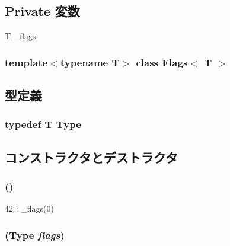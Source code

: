 \subsection*{Private 変数}
\begin{DoxyCompactItemize}
\item 
T \hyperlink{classFlags_a1d4945ed95e4ef8f9668e313afb5bd12}{\_\-flags}
\end{DoxyCompactItemize}
\subsubsection*{template$<$typename T$>$ class Flags$<$ T $>$}



\subsection{型定義}
\hypertarget{classFlags_a685b7a70f0ae1f2881cf8937d951c3b1}{
\subsubsection[{Type}]{\setlength{\rightskip}{0pt plus 5cm}typedef T {\bf Type}}}
\label{classFlags_a685b7a70f0ae1f2881cf8937d951c3b1}


\subsection{コンストラクタとデストラクタ}
\hypertarget{classFlags_a9d4763cab85470385da6310f3343fd88}{
\subsubsection[{Flags}]{ ()}}
\label{classFlags_a9d4763cab85470385da6310f3343fd88}



\begin{DoxyCode}
42 : _flags(0) {}
\end{DoxyCode}
\hypertarget{classFlags_a2c2c0ec31d357ed56d83db246e10fefc}{
\subsubsection[{Flags}]{ ({\bf Type} {\em flags})}}
\label{classFlags_a2c2c0ec31d357ed56d83db246e10fefc}




